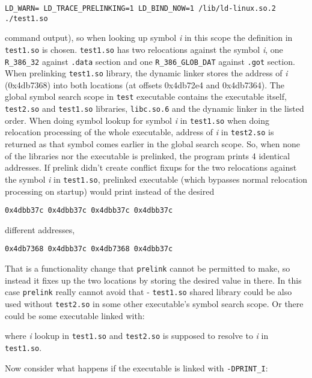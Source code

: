 \documentclass[twoside]{article}
\def\tts#1{\texttt{\small #1}}
\begin{document}
\tts{LD\_WARN= LD\_TRACE\_PRELINKING=1 LD\_BIND\_NOW=1 /lib/ld-linux.so.2 ./test1.so}

command output), so when looking up symbol {\sl i} in this
scope the definition in \tts{test1.so} is chosen.  \tts{test1.so} has two
relocations against the symbol {\sl i}, one \tts{R\_386\_32} against \tts{.data}
section and one \tts{R\_386\_GLOB\_DAT} against \tts{.got} section.  When
prelinking \tts{test1.so} library, the dynamic linker stores the address of
{\sl i} (0x4db7368) into both locations (at offsets 0x4db72e4 and 0x4db7364).
The global symbol search scope in \tts{test} executable contains the executable
itself, \tts{test2.so} and \tts{test1.so} libraries, \tts{libc.so.6} and
the dynamic linker in the listed order.
When doing symbol lookup for symbol {\sl i}
in \tts{test1.so} when doing relocation processing of the whole executable,
address of {\sl i} in \tts{test2.so} is returned as that symbol comes earlier
in the global search scope.  So, when none of the libraries nor the executable
is prelinked, the program prints 4 identical addresses.  If prelink didn't
create conflict fixups for the two relocations against the symbol {\sl i}
in \tts{test1.so}, prelinked executable (which bypasses normal relocation
processing on startup) would print instead of the desired

\tts{0x4dbb37c 0x4dbb37c 0x4dbb37c 0x4dbb37c}

different addresses,

\tts{0x4db7368 0x4dbb37c 0x4db7368 0x4dbb37c}

That is a functionality change that \tts{prelink} cannot be permitted to
make, so instead it fixes up the two locations by storing the desired
value in there.  In this case \tts{prelink} really cannot avoid that
- \tts{test1.so} shared library could be also used without \tts{test2.so}
in some other executable's symbol search scope.
Or there could be some executable linked with:


where {\sl i} lookup in \tts{test1.so} and \tts{test2.so} is supposed
to resolve to {\sl i} in \tts{test1.so}.

Now consider what happens if the executable is linked with \tts{-DPRINT\_I}:
\end{document}
